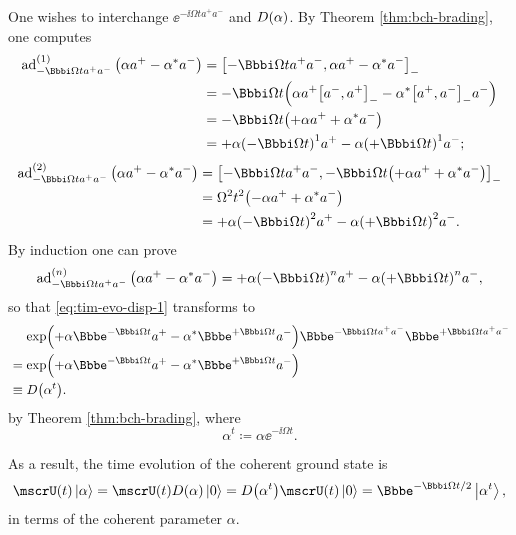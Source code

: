 One wishes to interchange $\ee^{-\ii \Omega t a^+ a^-}$ and
${D}\mathopen{}\left(\alpha\right)\mathclose{}$. By Theorem \ref{thm:bch-brading}, one computes
\begin{align}
\ad_{-\ii \Omega t a^+ a^-}^{(1)}\rbr{\alpha a^+ - \alpha^* a^-}
&= \sbr{-\ii \Omega t a^+ a^- , \alpha a^+ - \alpha^* a^-}_-
\nonumber\\
&= -\ii\Omega t \rbr{\alpha a^+\sbr{a^-, a^+}_- - \alpha^*\sbr{a^+, a^-}_- a^-}
\nonumber\\
&= -\ii\Omega t \rbr{+\alpha a^+ + \alpha^* a^-} \nonumber\\
&=	+ \alpha\rbr{-\ii\Omega t}^1 a^+
	- \alpha\rbr{+\ii\Omega t}^1 a^-;
\end{align}
\begin{align}
\ad_{-\ii \Omega t a^+ a^-}^{(2)}\rbr{\alpha a^+ - \alpha^* a^-}
&= \sbr{-\ii \Omega t a^+ a^-,
	-\ii\Omega t \rbr{+\alpha a^+ + \alpha^* a^-}}_-
\nonumber\\
&= \Omega^2 t^2\rbr{-\alpha a^+ + \alpha^* a^-}
\nonumber\\
&= + \alpha\rbr{-\ii\Omega t}^2 a^+
- \alpha\rbr{+\ii\Omega t}^2 a^-.
\end{align}
By induction one can prove
\begin{equation}
\ad_{-\ii \Omega t a^+ a^-}^{(n)}\rbr{\alpha a^+ - \alpha^* a^-}
= + \alpha\rbr{-\ii\Omega t}^n a^+
- \alpha\rbr{+\ii\Omega t}^n a^-,
\end{equation}
so that \cref{eq:tim-evo-disp-1} transforms to
\begin{align}
&\phantom{{}={}}\rfun{\exp}{+\alpha\ee^{-\ii\Omega t}a^+
	-\alpha^*\ee^{+\ii\Omega t}a^-}
	\ee^{-\ii \Omega t a^+ a^-}
	\ee^{+\ii \Omega t a^+ a^-} \\
&= \rfun{\exp}{+\alpha\ee^{-\ii\Omega t}a^+
-\alpha^*\ee^{+\ii\Omega t}a^-} \\
&\equiv \rfun{D}{\alpha^t}.
\end{align}
by Theorem \ref{thm:bch-brading}, where
\begin{equation}
\alpha^t\coloneqq \alpha\ee^{-\ii\Omega t}.
\end{equation}

As a result, the time evolution of the coherent ground state is
\begin{equation}
\rfun{\mscrU}{t} \Ket{\alpha} = \rfun{\mscrU}{t} \rfun{D}{\alpha} \Ket{0}
= \rfun{D}{\alpha^t} \rfun{\mscrU}{t} \Ket{0}
= \ee^{-\ii\Omega t/2}\Ket{\alpha^t},
\end{equation}
in terms of the coherent parameter $\alpha$.

